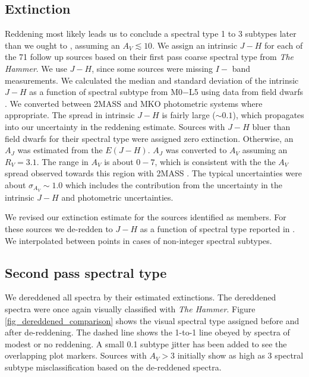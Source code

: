 \subsection{Extinction}
Reddening most likely leads us to conclude a spectral type 1 to 3 subtypes later than we ought to \citep{2010A&A...515A..75A}, assuming an $A_V\lesssim10$.  We assign an intrinsic $J-H$ for each of the 71 follow up sources based on their first pass coarse spectral type from \emph{The Hammer}.  We use $J-H$, since some sources were missing $I-$ band measurements.  We calculated the median and standard deviation of the intrinsic $J-H$ as a function of spectral subtype from M0$-$L5 using data from field dwarfs \citep{2011AJ....141...97W,2012ApJS..201...19D}.  We converted between 2MASS and MKO photometric systems where appropriate.  The spread in intrinsic $J-H$ is fairly large ($\sim0.1$), which propagates into our uncertainty in the reddening estimate.  Sources with $J-H$ bluer than field dwarfs for their spectral type were assigned zero extinction.  Otherwise, an $A_J$ was estimated from the $E(J-H)$.  $A_J$ was converted to $A_V$ assuming an $R_V=3.1$.  The range in $A_V$ is about $0 - 7$, which is consistent with the the $A_V$ spread observed towards this region with 2MASS \citep{2008A&A...489..143L}.  The typical uncertainties were about $\sigma_{A_V}\sim1.0$ which includes the contribution from the uncertainty in the intrinsic $J-H$ and photometric uncertainties.

We revised our extinction estimate for the sources identified as members.  For these sources we de-redden to $J-H$ as a function of spectral type reported in \citet{2013ApJS..208....9P}.  We interpolated between points in cases of non-integer spectral subtypes.

\subsection{Second pass spectral type}
We dereddened all spectra by their estimated extinctions.  The dereddened spectra were once again visually classified with \emph{The Hammer}.  Figure \ref{fig_dereddened_comparison} shows the visual spectral type assigned before and after de-reddening.  The dashed line shows the 1-to-1 line obeyed by spectra of modest or no reddening.  A small 0.1 subtype jitter has been added to see the overlapping plot markers.  Sources with $A_V >3 $ initially show as high as 3 spectral subtype misclassification based on the de-reddened spectra.


